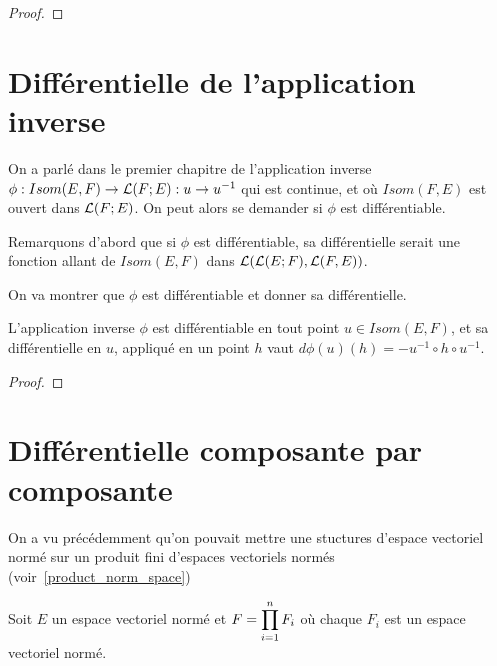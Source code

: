 \ifdefined\outputproof
\begin{proof}

\end{proof}
\fi

\section{Différentielle de l'application inverse}

On a parlé dans le premier chapitre de l'application inverse
$\phi : Isom(E, F) \rightarrow \mathcal{L}(F; E) : u \rightarrow
u^{-1}$ qui est continue, et où $Isom(F, E)$ est ouvert dans
$\mathcal{L}(F; E)$.
On peut alors se demander si $\phi$ est différentiable.

Remarquons d'abord que si $\phi$ est différentiable, sa différentielle serait
une fonction allant de $Isom(E, F)$ dans $\mathcal{L}(\mathcal{L}(E; F), \mathcal{L}(F,
E))$.

On va montrer que $\phi$ est différentiable et donner sa différentielle.

\begin{theorem}
\label{differential_inverse_application}
	L'application inverse $\phi$ est différentiable en tout point $u \in Isom(E,
	F)$, et sa différentielle en $u$, appliqué en un point $h$ vaut $d\phi(u)(h)
	= -u^{-1} \circ h \circ u^{-1}$.
\end{theorem}

\ifdefined\outputproof
\begin{proof}

\end{proof}
\fi

\section{Différentielle composante par composante}
\label{section_differential_composante}


On a vu précédemment qu'on pouvait mettre une stuctures d'espace vectoriel
normé sur un produit fini d'espaces vectoriels normés (voir~\ref{product_norm_space})

Soit $E$ un espace vectoriel normé et $F = \displaystyle \prod_{i = 1}^{n} F_{i}$ où chaque
$F_{i}$ est un espace vectoriel normé.

